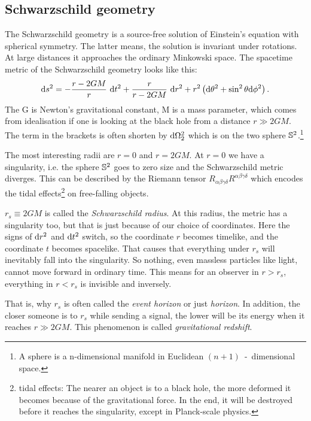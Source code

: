 \subsection{Schwarzschild geometry \checkmark}
	
	The Schwarzschild geometry is a source-free solution of Einstein's equation  with spherical symmetry. The latter means, the solution is invariant under rotations. 
	At large distances it approaches the ordinary Minkowski space.
	The spacetime metric of the Schwarzschild geometry looks like this:\\
		\begin{equation} \label{p.3 (2.1)}
		\mathrm{d} s^2=-\frac{r-2GM}{r}~ \mathrm{d} t^2+\frac{r}{r-2GM}~
		\mathrm{d} r^2+r^2 \left( \mathrm{d} \theta^2+\sin^2\theta \mathrm{d} \phi^2 \right).
		\end{equation}
	The G is Newton's gravitational constant, M is a mass parameter, which comes from idealisation if one is looking at the black hole from a distance $r\gg 2GM$.
	The term in the brackets is often shorten by $\mathrm{d} \Omega_2^2$ which is on the two sphere $\mathbb{S}^2$.\footnote{A sphere is a n-dimensional manifold in Euclidean $(n+1)$~-~dimensional space.}
	
	The most interesting radii are $r=0$ and $r=2GM$.
	At $r=0$ we have a singularity, i.e. the sphere $\mathbb{S}^2$ goes to zero size and the Schwarzschild metric diverges.
	This can be described by the Riemann tensor $R_{\alpha\beta\gamma \delta}R^{\alpha\beta\gamma\delta}$ which encodes the tidal effects\footnote{tidal effects: The nearer an object is to a black hole, the more deformed it becomes because of the gravitational force. In the end, it will be destroyed before it reaches the singularity, except in Planck-scale physics.} on free-falling objects.
	
	$r_{s}\equiv 2GM$ is called the \textit{Schwarzschild radius}. At this radius, the metric has a singularity too, but that is just because of our choice of coordinates. Here the signs of $\mathrm{d} r^2$ and $\mathrm{d} t^2$ switch, so the coordinate $r$ becomes timelike, and the coordinate $t$ becomes spacelike. That causes that everything under $r_{s}$ will inevitably fall into the singularity. 
	So nothing, even massless particles like light, cannot move forward in ordinary time. This means for an observer in $r>r_{s}$, everything in $r<r_{s}$ is invisible and inversely. 
	
	That is, why $r_{s}$ is often called the \textit{event horizon} or just \textit{horizon}.
	In addition, the closer someone is to $r_{s}$ while sending a signal, the lower will be its energy when it reaches $r\gg 2GM$. This phenomenon is called \textit{gravitational redshift}.
